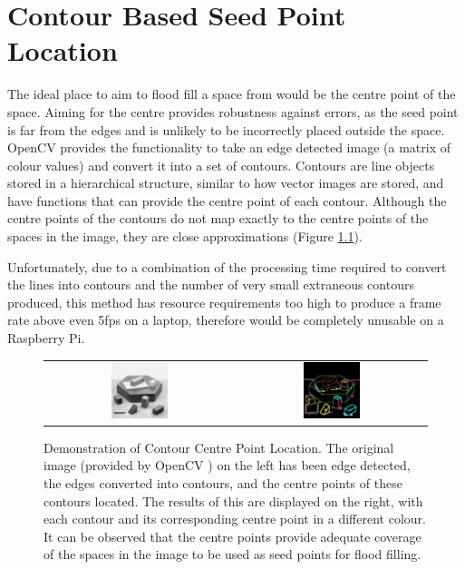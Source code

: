 \chapter{Contour Based Seed Point Location}
\label{appendix:contour}

The ideal place to aim to flood fill a space from would be the centre point of the space. Aiming for the centre provides robustness against errors, as the seed point is far from the edges and is unlikely to be incorrectly placed outside the space. OpenCV provides the functionality to take an edge detected image (a matrix of colour values) and convert it into a set of contours. Contours are line objects stored in a hierarchical structure, similar to how vector images are stored, and have functions that can provide the centre point of each contour. Although the centre points of the contours do not map exactly to the centre points of the spaces in the image, they are close approximations (Figure \ref{fig:ContourCentres}).

Unfortunately, due to a combination of the processing time required to convert the lines into contours and the number of very small extraneous contours produced, this method has resource requirements too high to produce a frame rate above even 5fps on a laptop, therefore would be completely unusable on a Raspberry Pi.

\begin{figure}[H]
    \begin{center}
    \begin{tabular}{ c c }
        \includegraphics[width=0.31\textwidth]{Figures/blox.jpg} &
        \includegraphics[width=0.31\textwidth]{Figures/ContourCentres.jpg}
    \end{tabular}
    \caption[Demonstration of Contour Centre Point Location]{Demonstration of Contour Centre Point Location. The original image (provided by OpenCV \cite{OpenCV}) on the left has been edge detected, the edges converted into contours, and the centre points of these contours located. The results of this are displayed on the right, with each contour and its corresponding centre point in a different colour. It can be observed that the centre points provide adequate coverage of the spaces in the image to be used as seed points for flood filling.}
    \label{fig:ContourCentres}
    \end{center}
\end{figure}

